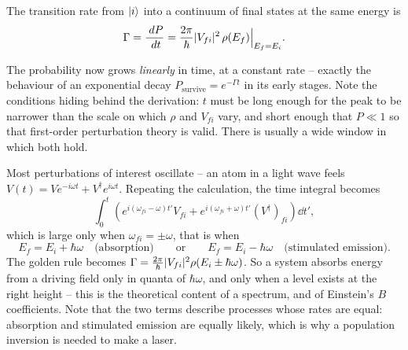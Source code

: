\documentclass[a4paper]{scrartcl}
\begin{document}
\begin{theorem}
    The transition rate from $\ket i$ into a continuum of final states at the same energy is
    $$
    \Gamma = \frac{\; d P}{\; d t} = \frac{2\pi}{\hbar}\lvert V_{fi}\rvert^2\,\rho(E_f)\Big|_{E_f = E_i}.
    $$
\end{theorem}

The probability now grows \emph{linearly} in time, at a constant rate -- exactly the behaviour of an exponential decay $P_{\text{survive}} = e^{-\Gamma t}$ in its early stages. Note the conditions hiding behind the derivation: $t$ must be long enough for the peak to be narrower than the scale on which $\rho$ and $V_{fi}$ vary, and short enough that $P \ll 1$ so that first-order perturbation theory is valid. There is usually a wide window in which both hold.

\begin{center}
\end{center}

\begin{example}
    Most perturbations of interest oscillate -- an atom in a light wave feels $V(t) = V e^{-i\omega t} + V^\dagger e^{i\omega t}$. Repeating the calculation, the time integral becomes
    $$
    \int_0^t \left( e^{i(\omega_{fi}-\omega)t'}V_{fi} + e^{i(\omega_{fi}+\omega)t'}(V^\dagger)_{fi} \right)\dd t',
    $$
    which is large only when $\omega_{fi} = \pm\omega$, that is when
    $$
    E_f = E_i + \hbar\omega \quad \text{(absorption)} \qquad \text{or} \qquad E_f = E_i - \hbar\omega \quad \text{(stimulated emission)}.
    $$
    The golden rule becomes $\Gamma = \frac{2\pi}{\hbar}\lvert V_{fi}\rvert^2\rho(E_i\pm\hbar\omega)$. So a system absorbs energy from a driving field only in quanta of $\hbar\omega$, and only when a level exists at the right height -- this is the theoretical content of a spectrum, and of Einstein's $B$ coefficients. Note that the two terms describe processes whose rates are equal: absorption and stimulated emission are equally likely, which is why a population inversion is needed to make a laser.
\end{example}
\end{document}
